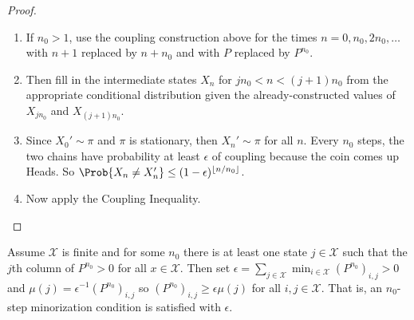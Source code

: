 \documentclass[12pt]{article}
\begin{document}
\begin{proof}
    \begin{enumerate}
        \item
            If \( n_0 > 1 \), use the coupling construction above for
            the times \( n = 0, n_0, 2n_0, \dots \) with \( n+1 \)
            replaced by \( n + n_0 \) and with \( P \) replaced by \( P^
            {n_0} \).
        \item
            Then fill in the intermediate states \( X_n \) for \( j n_0
            < n < (j+1) n_0 \) from the appropriate conditional
            distribution given the already-constructed values of \( X_{j
            n_0} \) and \( X_{(j+1)n_0} \).
        \item
            Since \( X_0' \sim \pi \) and \( \pi \) is stationary, then \(
            X_n' \sim \pi \) for all \( n \).  Every \( n_0 \) steps,
            the two chains have probability at least \( \epsilon \) of
            coupling because the coin comes up Heads.  So \( \Prob{X_n
            \ne X_n'} \le (1-\epsilon)^{\lfloor n/n_0 \rfloor} \).
        \item
            Now apply the Coupling Inequality.
    \end{enumerate}
\end{proof}

Assume \( \mathcal{X} \) is finite and for some \( n_0 \) there is at
least one state \( j \in \mathcal{X} \) such that the \( j \)th column
of \( P^{n_0} > 0 \) for all \( x \in \mathcal{X} \).  Then set \(
\epsilon = \sum_{j \in \mathcal{X}} \min_{i \in \mathcal{X}} (P^{n_0})_{i,j}
> 0 \) and \( \mu(j) = \epsilon^{-1} (P^{n_0})_{i,j} \) so \( (P^{n_0})_
{i,j} \ge \epsilon \mu(j) \) for all \( i,j \in \mathcal{X} \).  That
is, an \( n_0 \)-step minorization condition is satisfied with \(
\epsilon \).
\end{document}
